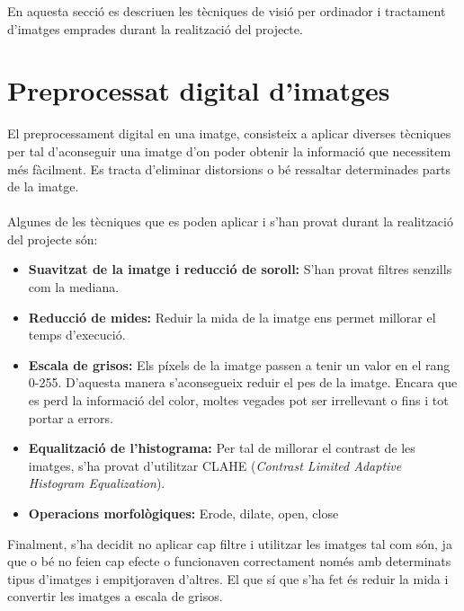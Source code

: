 \label{sec:Tecniques}

En aquesta secció es descriuen les tècniques de visió per ordinador i tractament d'imatges emprades durant la realització del projecte.

\section{Preprocessat digital d'imatges}
	El preprocessament digital en una imatge, consisteix a aplicar diverses tècniques per tal d'aconseguir una imatge d'on poder obtenir la informació que necessitem més fàcilment. Es tracta
	d'eliminar distorsions o bé ressaltar determinades parts de la imatge.\\\\
	Algunes de les tècniques que es poden aplicar i s'han provat durant la realització del projecte són:

	\begin{itemize}
		\item{\textbf{Suavitzat de la imatge i reducció de soroll:} S'han provat filtres senzills com la mediana.}
		\item{\textbf{Reducció de mides:} Reduir la mida de la imatge ens permet millorar el temps d'execució.}
		\item{\textbf{Escala de grisos:} Els píxels de la imatge passen a tenir un valor en el rang 0-255. D'aquesta manera s'aconsegueix reduir el pes de la imatge. Encara que es perd la informació del color, moltes
		vegades pot ser irrellevant o fins i tot portar a errors.}
		\item{\textbf{Equalització de l'histograma:} Per tal de millorar el contrast de les imatges, s'ha provat d'utilitzar CLAHE (\textit{Contrast Limited Adaptive Histogram Equalization}).}
		\item{\textbf{Operacions morfològiques:} Erode, dilate, open, close}
	\end{itemize}
\noindent
	Finalment, s'ha decidit no aplicar cap filtre i utilitzar les imatges tal com són, ja que o bé no feien cap efecte o funcionaven correctament només amb determinats tipus d'imatges i empitjoraven d'altres.
	El que sí que s'ha fet és reduir la mida i convertir les imatges a escala de grisos.

\newpage
